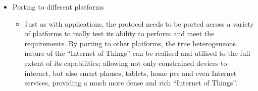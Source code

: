 \begin{itemize}
\begin{itemize}
	\end{itemize}
	\item Porting to different platforms
	\begin{itemize}
		\item Just as with applications, the protocol needs to be ported across a variety of platforms to really test its ability to perform and meet the requirements. By porting to other platforms, the true heterogeneous nature of the ``Internet of Things'' can be realised and utilised to the full extent of its capabilities; allowing not only constrained devices to interact, but also smart phones, tablets, home pcs and even Internet services, providing a much more dense and rich ``Internet of Things''.
	\end{itemize}
\end{itemize}


